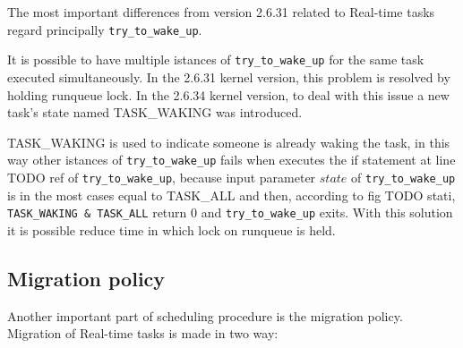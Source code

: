 The most important differences from version 2.6.31 related to Real-time tasks regard principally \texttt{try\_to\_wake\_up}.

It is possible to have multiple istances of \texttt{try\_to\_wake\_up} for the same task executed simultaneously. In the 2.6.31 kernel version, this problem
is resolved by holding runqueue lock. In the 2.6.34 kernel version, to deal with this issue a new task's state named TASK\_WAKING was introduced. 

\lstset{basicstyle=\footnotesize, language=c, captionpos=b, frame=single,label=lis:steps}


TASK\_WAKING is used to indicate someone is already waking the task, in this way other istances of \texttt{try\_to\_wake\_up} fails when executes the if 
statement at line TODO ref of \texttt{try\_to\_wake\_up}, because input parameter $state$ of \texttt{try\_to\_wake\_up} is in the most cases equal to 
TASK\_ALL and then, according to fig TODO stati, \texttt{TASK\_WAKING \& TASK\_ALL} return 0 and \texttt{try\_to\_wake\_up} exits. With this solution 
it is possible reduce time in which lock on runqueue is held. 


\subsection{Migration policy}

Another important part of scheduling procedure is the migration policy. Migration of Real-time tasks is made in two way: 

